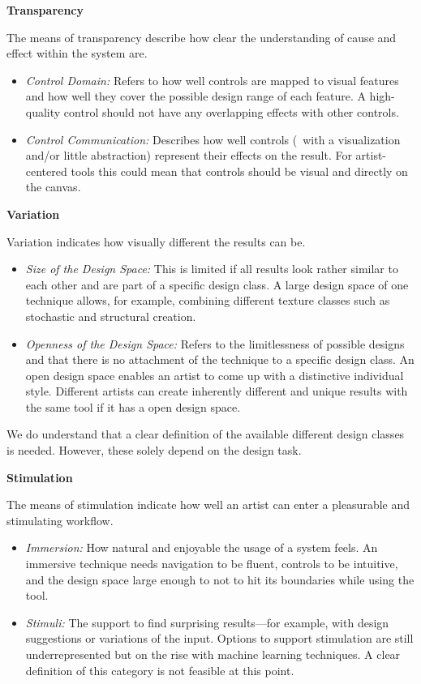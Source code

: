 \noindent\textbf{Transparency}
\label{subsubsec:transparency}

The means of transparency describe how clear the understanding of cause and effect within the system are.

\begin{itemize}
    \item \textit{Control Domain:} Refers to how well controls are mapped to visual features and how well they cover the possible design range of each feature. A high-quality control should not have any overlapping effects with other controls.
    \item \textit{Control Communication:} Describes how well controls (\eg~with a visualization and/or little abstraction) represent their effects on the result. For artist-centered tools this could mean that controls should be visual and directly on the canvas.
\end{itemize}


\noindent\textbf{Variation}\label{subsubsec:variation}

Variation indicates how visually different the results can be.

\begin{itemize}
    \item \textit{Size of the Design Space:} This is limited if all results look rather similar to each other and are part of a specific design class. A large design space of one technique allows, for example, combining different texture classes such as stochastic and structural creation.
    \item \textit{Openness of the Design Space:} Refers to the limitlessness of possible designs and that there is no attachment of the technique to a specific design class. An open design space enables an artist to come up with a distinctive individual style. Different artists can create inherently different and unique results with the same tool if it has a open design space.
\end{itemize}

We do understand that a clear definition of the available different design classes is needed. However, these solely depend on the design task. 


\noindent\textbf{Stimulation}
\label{subsubsec:stimulation}

The means of stimulation indicate how well an artist can enter a pleasurable and stimulating workflow.
\begin{itemize}
    \item \textit{Immersion:} How natural and enjoyable the usage of a system feels.
    An immersive technique needs navigation to be fluent, controls to be intuitive, and the design space large enough to not to hit its boundaries while using the tool. 
    
    \item \textit{Stimuli:} The support to find surprising results---for example, with design suggestions or variations of the input. Options to support stimulation are still underrepresented but on the rise with machine learning techniques. A clear definition of this category is not feasible at this point.

\end{itemize}

